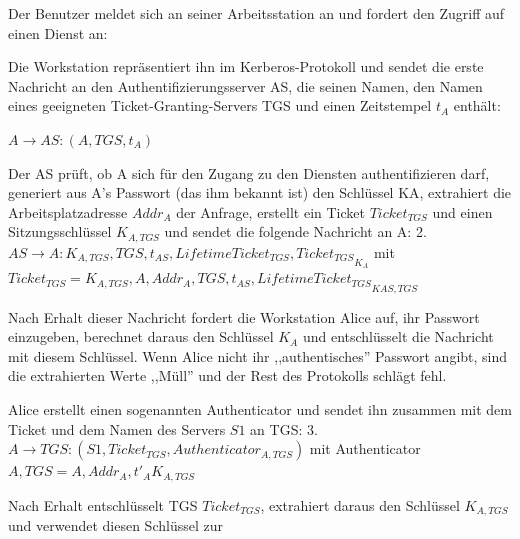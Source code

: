 \documentclass[a4paper]{article}
\begin{document}
\begin{multicols}{3}
      \begin{itemize*}
            \item Der Benutzer meldet sich an seiner Arbeitsstation an und fordert den
            Zugriff auf einen Dienst an:
            \begin{itemize*}
                  \item Die Workstation repräsentiert ihn im Kerberos-Protokoll und sendet die erste Nachricht an den Authentifizierungsserver AS, die seinen Namen, den Namen eines geeigneten Ticket-Granting-Servers TGS und einen Zeitstempel $t_A$ enthält:
            \end{itemize*}
            \begin{enumerate*}
                  \def\labelenumi{\arabic{enumi}.}
                  \item $A\rightarrow AS:(A, TGS, t_A)$
            \end{enumerate*}
            \item Der AS prüft, ob A sich für den Zugang zu den Diensten
            authentifizieren darf, generiert aus A's Passwort (das ihm bekannt
            ist) den Schlüssel KA, extrahiert die Arbeitsplatzadresse $Addr_A$
            der Anfrage, erstellt ein Ticket $Ticket_{TGS}$ und einen
            Sitzungsschlüssel $K_{A,TGS}$ und sendet die folgende Nachricht
            an A: 2. $AS\rightarrow A:{ K_{A,TGS}, TGS, t_{AS}, LifetimeTicket_{TGS}, Ticket_{TGS}}_{K_A}$ mit $Ticket_{TGS}={K_{A,TGS},A, Addr_A, TGS, t_{AS}, LifetimeTicket_{TGS}}_{{K}{AS,TGS}}$
            \item Nach Erhalt dieser Nachricht fordert die Workstation Alice auf, ihr
            Passwort einzugeben, berechnet daraus den Schlüssel $K_A$ und
            entschlüsselt die Nachricht mit diesem Schlüssel. Wenn Alice nicht ihr
            ,,authentisches'' Passwort angibt, sind die extrahierten Werte
            ,,Müll'' und der Rest des Protokolls schlägt fehl.
            \item Alice erstellt einen sogenannten Authenticator und sendet ihn zusammen
            mit dem Ticket und dem Namen des Servers $S1$ an TGS: 3.
            $A\rightarrow TGS:(S1, Ticket_{TGS},
                  Authenticator_{A,TGS})$ mit Authenticator
            $A,TGS={A,Addr_A,t'_{A}}{K_{A,TGS}}$
            \item Nach Erhalt entschlüsselt TGS $Ticket_{TGS}$, extrahiert daraus
            den Schlüssel $K_{A,TGS}$ und verwendet diesen Schlüssel zur

\end{itemize*}
\end{multicols}
\end{document}

